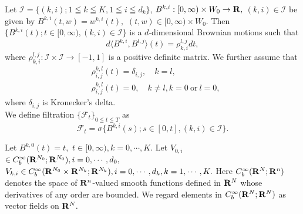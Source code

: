 \documentclass[12pt]{article}
\begin{document}
Let $\mathcal{I} = \{(k,i); 1 \leqq k \leqq K , 1 \leqq i \leqq d_k \}$, $B^{k,i}:[0,\infty )\times W_0 \to {\bf R},$ $(k,i) \in \mathcal{I}$ be given 
by $B^{k, i}(t,w) =w^{k, i}(t),$ $(t,w)\in [0,\infty )\times W_0.$
Then $\{B^{k,i}(t); t \in [0,\infty ), (k,i)\in \mathcal{I} \}$ 
is a $d$-dimensional Brownian motions such that
$$d\langle B^{k, i}, B^{l, j} \rangle(t) = \rho_{k, i}^{l,j}dt,$$
where $ \rho_{k,i}^{l,j}: \mathcal{I} \times \mathcal{I} \to [-1,1] $ is a positive definite matrix. We further assume that
\begin{align*}
&\rho_{i, j}^{k,l}(t) = \delta_{i,j}, \quad k =l,\\
&\rho_{i, j}^{k,l}(t) =  0, \quad k\neq l, k=0 \ \text{or} \ l =0,
\end{align*}
where $\delta_{i,j}$ is Kronecker's delta.\\
We define filtration $\{\mathcal{F}_t\}_{0\leqq t \leqq T}$ as
$$\mathcal{F}_t= \sigma \{B^{k,i}(s); s \in [0,t], (k,i)\in \mathcal{I} \}.$$

\noindent Let $B^{k,0}(t) = t,$ $t \in [0,\infty ), k=0, \cdots, K.$
Let $V_{0, i}$ $ \in C^{\infty}_b({\bf R}^{{N}_0}; {\bf R}^{{N}_0}), i =0,\cdots, d_0,$
$V_{k, i} \in C^{\infty}_b({\bf R}^{{N}_0}\times {\bf R}^{{N}_k};{\bf R}^{{N}_k}), i =0, \cdots, d_k, k=1, \cdots, K.$
Here $C^{\infty}_b({\bf R}^{N} ;{\bf R}^{n})$ denotes 
the space of ${\bf R}^{n}$-valued smooth functions defined 
in ${\bf R}^{N}$ whose derivatives of any order are bounded.
We regard elements in $C^{\infty}_b({\bf R}^{N};{\bf R}^{N})$ 
as vector fields on ${\bf R}^N.$\\
\end{document}
